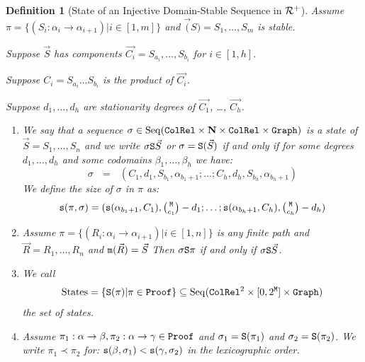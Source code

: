 \documentclass{lmcs}
\newtheorem{definition}[theorem]{Definition}
\begin{document}
\begin{definition}[State of an Injective Domain-Stable Sequence in ${\mathcal R}^+$]
Assume  $\pi = \{(S_i:\alpha_i \rightarrow \alpha_{i+1}) | i \in [1,m]\}$
and $\vec(S) = S_1, \ldots, S_m$ is stable.

Suppose $\vec{S}$ has components $\vec{C_i} = S_{a_i},\ldots, S_{b_i}$ for $i \in [1,h]$.

Suppose $C_i = S_{a_i}\ldots S_{b_i}$ is the product of $\vec{C_i}$.

Suppose $d_1, \ldots, d_h$ are stationarity degrees of  $\vec{C_1}$, \ldots,  $\vec{C_h}$.

\begin{enumerate}

\item
We say that a sequence $\sigma \in {\rm Seq}({\tt ColRel} \times {\bf N} \times {\tt ColRel} \times {\tt Graph})$ 
is a state of $\vec{S} = S_1, \ldots, S_n$ and we write $\sigma {\tt S} \vec{S}$
or $\sigma = {\tt S}(\vec{S})$ if and only if 
for some degrees  $d_1, \ldots, d_h$ and some codomains $\beta_1, \ldots, \beta_h$ we have:
$$
\sigma \ \ \ 
= \ \ \ 
(
C_1, d_1, S_{b_1},\alpha_{b_1 + 1};
\ldots;
C_h, d_h, S_{b_h},\alpha_{b_h + 1}
)
$$
We define the size of $\sigma$ in $\pi$ as:
$$
\size(\pi,\sigma)
=
(
\size(\alpha_{b_1 + 1}, C_1), \newton{\MaxInd}{c_1}-d_1; 
\ldots;
\size(\alpha_{b_h + 1}, C_h), \newton{\MaxInd}{c_h}-d_h
)
$$

\item
Assume $\pi = \{(R_i:\alpha_i \rightarrow \alpha_{i+1}) | i \in [1,n]\}$ is any finite path
and $\vec{R} = R_1, \ldots, R_n$ and  ${\tt m}(\vec{R}) = \vec{S}$
Then $\sigma {\tt S} \pi$ if and only if $\sigma {\tt S}  \vec{S}$. 

\item 
We call 
$$
{{\rm States}} =  \{{\tt S}(\pi) | \pi \in {\tt Proof}\} 
\subseteq 
{\rm Seq}({\tt ColRel}^2 \times [0,2^{\tt M}] \times {\tt Graph})
$$
the set of states. 

\item
Assume $\pi_1:\alpha \rightarrow \beta, \pi_2:\alpha \rightarrow \gamma \in {\tt Proof}$ 
and $\sigma_1 = {\tt S}(\pi_1)$ and 
$\sigma_2 = {\tt S}(\pi_2)$. We write $\pi_1 \prec \pi_2$ for: 
${\tt s}(\beta,\sigma_1) < {\tt s}(\gamma,\sigma_2)$ in the lexicographic order.
\end{enumerate}
\end{definition}
\end{document}
